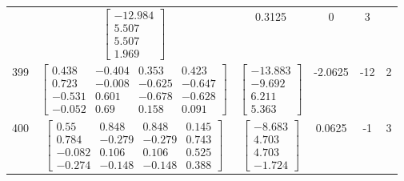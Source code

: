 \documentclass[a4paper,12pt]{article}
\begin{document}
\begin{tabular}{c c c c c c}
&
$\begin{bmatrix} -12.984 \\ 5.507 \\ 5.507 \\ 1.969 \end{bmatrix}$
&
0.3125
&
0
&
3
\\
399
&
$\begin{bmatrix} 0.438 & -0.404 & 0.353 & 0.423 \\ 0.723 & -0.008 & -0.625 & -0.647 \\ -0.531 & 0.601 & -0.678 & -0.628 \\ -0.052 & 0.69 & 0.158 & 0.091 \end{bmatrix}$
&
$\begin{bmatrix} -13.883 \\ -9.692 \\ 6.211 \\ 5.363 \end{bmatrix}$
&
-2.0625
&
-12
&
2
\\
400
&
$\begin{bmatrix} 0.55 & 0.848 & 0.848 & 0.145 \\ 0.784 & -0.279 & -0.279 & 0.743 \\ -0.082 & 0.106 & 0.106 & 0.525 \\ -0.274 & -0.148 & -0.148 & 0.388 \end{bmatrix}$
&
$\begin{bmatrix} -8.683 \\ 4.703 \\ 4.703 \\ -1.724 \end{bmatrix}$
&
0.0625
&
-1
&
3
\\
\end{tabular} \egroup \newpage
\end{document}
